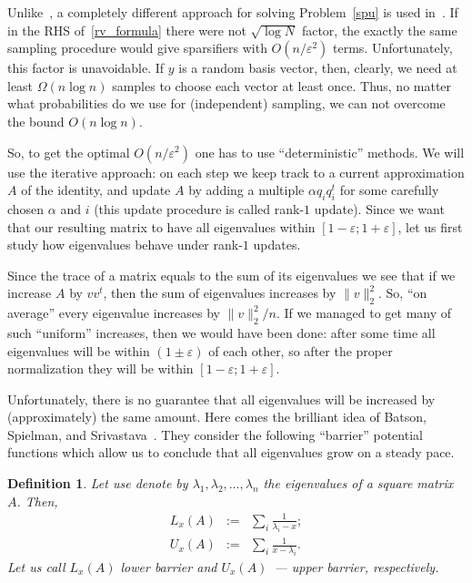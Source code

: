 \documentclass[12pt]{article}
\newcommand{\eps}{\varepsilon}
\newtheorem{definition}{Definition}
\begin{document}
    Unlike~\cite{SS11}, a completely different approach for solving Problem~\ref{spu}
    is used in~\cite{BSS09}.
    If in the RHS of~\ref{rv_formula} there were not $\sqrt{\log N}$ factor, the exactly
    the same sampling procedure would give sparsifiers with $O(n / \eps^2)$ terms.
    Unfortunately, this factor is unavoidable.
    If $y$ is a random basis vector, then, clearly, we need at least $\Omega(n \log n)$
    samples to choose each vector at least once.
    Thus, no matter what probabilities do we use for (independent) sampling, we can not
    overcome the bound $O(n \log n)$.

    So, to get the optimal $O(n / \eps^2)$ one has to use ``deterministic'' methods.
    We will use the iterative approach: on each step we keep track to a current approximation
    $A$ of the identity, and update $A$ by adding a multiple $\alpha q_i q_i^t$ for some
    carefully chosen $\alpha$ and $i$ (this update procedure is called rank-$1$ update).
    Since we want that our resulting matrix to have all eigenvalues within
    $[1 - \eps; 1 + \eps]$, let us first study how eigenvalues behave under rank-$1$
    updates.

    Since the trace of a matrix equals to the sum of its eigenvalues we see that if
    we increase $A$ by $vv^t$, then the sum of eigenvalues increases by $\|v\|_2^2$.
    So, ``on average'' every eigenvalue increases by $\|v\|_2^2 / n$.
    If we managed to get many of such ``uniform'' increases, then we would have been done:
    after some time all eigenvalues will be within $(1 \pm \eps)$ of each other, so after
    the proper normalization they will be within $[1 - \eps; 1 + \eps]$.

    Unfortunately, there is no guarantee that all eigenvalues will be increased by
    (approximately) the same amount.
    Here comes the brilliant idea of Batson, Spielman, and Srivastava~\cite{BSS09}.
    They consider the following ``barrier'' potential functions which allow us to conclude
    that all eigenvalues grow on a steady pace.

    \begin{definition}
        Let use denote by $\lambda_1, \lambda_2, \ldots, \lambda_n$ the eigenvalues of
        a square matrix $A$. Then,
        \begin{eqnarray*}
            L_{x}(A) &:=& \sum_{i} \frac{1}{\lambda_i - x}; \\
            U_{x}(A) &:=& \sum_{i} \frac{1}{x - \lambda_i}.
        \end{eqnarray*}
        Let us call $L_x(A)$ \emph{lower barrier} and $U_x(A)$~--- upper barrier,
        respectively.
    \end{definition}
\end{document}
